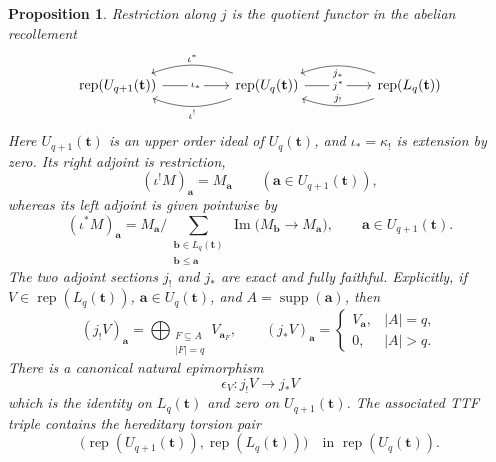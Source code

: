 \documentclass[12pt,reqno]{amsart}
\newtheorem{proposition}[theorem]{Proposition}
\theoremstyle{definition}
\theoremstyle{remark}
\newcommand{\Rep}{\operatorname{rep}}
\begin{document}
\begin{proposition}\label{prop:horizontal-embeddings}
Restriction along $j$ is the quotient functor in the abelian recollement
\[
\begin{tikzcd}[column sep=4.8em]
\Rep(U_{q+1}(\mathbf t))
  \arrow[r, "\iota_*" description]
& \Rep(U_q(\mathbf t))
  \arrow[l, bend right=20, "\iota^*"']
  \arrow[l, bend left=20, "\iota^!"]
  \arrow[r, "j^*" description]
& \Rep(L_q(\mathbf t))
  \arrow[l, bend left=20, "j_!"']
  \arrow[l, bend right=20, "j_*"]
\end{tikzcd}
\]
Here $U_{q+1}(\mathbf t)$ is an upper order ideal of $U_q(\mathbf t)$, and
$\iota_*=\kappa_!$ is extension by zero.  Its right adjoint is restriction,
\[
(\iota^!M)_{\mathbf a}=M_{\mathbf a}
\qquad(\mathbf a\in U_{q+1}(\mathbf t)),
\]
whereas its left adjoint is given pointwise by
\[
(\iota^*M)_{\mathbf a}
=
M_{\mathbf a}\Big/
\sum_{\substack{\mathbf b\in L_q(\mathbf t)\\\mathbf b\le\mathbf a}}
\operatorname{Im}\bigl(M_{\mathbf b}\longrightarrow M_{\mathbf a}\bigr),
\qquad \mathbf a\in U_{q+1}(\mathbf t).
\]
The two adjoint sections $j_!$ and $j_*$ are exact and fully faithful.  Explicitly, if $V\in\Rep(L_q(\mathbf t))$, $\mathbf a\in U_q(\mathbf t)$, and $A=\operatorname{supp}(\mathbf a)$, then
\[
(j_!V)_{\mathbf a}
=
\bigoplus_{\substack{F\subseteq A\\|F|=q}}V_{\mathbf a_F},
\qquad
(j_*V)_{\mathbf a}
=
\begin{cases}
V_{\mathbf a},&|A|=q,\\
0,&|A|>q.
\end{cases}
\]
There is a canonical natural epimorphism
\[
\epsilon_V:j_!V\longrightarrow j_*V
\]
which is the identity on $L_q(\mathbf t)$ and zero on $U_{q+1}(\mathbf t)$.
The associated TTF triple contains the hereditary torsion pair
\[
\bigl(\Rep(U_{q+1}(\mathbf t)),\Rep(L_q(\mathbf t))\bigr)
\quad\text{in }\Rep(U_q(\mathbf t)).
\]
\end{proposition}
\end{document}
